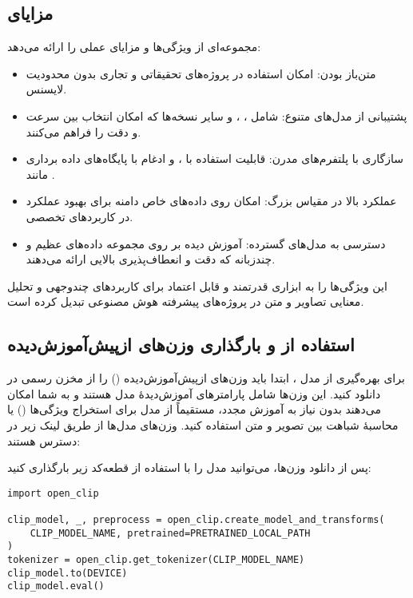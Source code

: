 \documentclass{article}
\begin{document}
\subsection{مزایای }
 مجموعه‌ای از ویژگی‌ها و مزایای عملی را ارائه می‌دهد:
\begin{itemize}
\item متن‌باز بودن: امکان استفاده در پروژه‌های تحقیقاتی و تجاری بدون محدودیت لایسنس.

\item پشتیبانی از مدل‌های متنوع: شامل ، ،  و سایر نسخه‌ها که امکان انتخاب بین سرعت و دقت را فراهم می‌کنند.

\item سازگاری با پلتفرم‌های مدرن: قابلیت استفاده با ،  و ادغام با پایگاه‌های داده برداری مانند .

\item عملکرد بالا در مقیاس بزرگ: امکان  روی داده‌های خاص دامنه برای بهبود عملکرد در کاربردهای تخصصی.

\item دسترسی به مدل‌های  گسترده: آموزش دیده بر روی مجموعه داده‌های عظیم و چندزبانه که دقت و انعطاف‌پذیری بالایی ارائه می‌دهند.

\end{itemize}

این ویژگی‌ها  را به ابزاری قدرتمند و قابل اعتماد برای کاربردهای چندوجهی و تحلیل معنایی تصاویر و متن در پروژه‌های پیشرفته هوش مصنوعی تبدیل کرده است.

\subsection{استفاده از  و بارگذاری وزن‌های ازپیش‌آموزش‌دیده}
برای بهره‌گیری از مدل ، ابتدا باید وزن‌های ازپیش‌آموزش‌دیده () را از مخزن رسمی  در  دانلود کنید.
این وزن‌ها شامل پارامترهای آموزش‌دیدهٔ مدل هستند و به شما امکان می‌دهند بدون نیاز به آموزش مجدد، مستقیماً از مدل برای استخراج ویژگی‌ها () یا محاسبهٔ شباهت بین تصویر و متن استفاده کنید.
وزن‌های مدل‌ها از طریق لینک زیر در دسترس هستند:


پس از دانلود وزن‌ها، می‌توانید مدل را با استفاده از قطعه‌کد زیر بارگذاری کنید:

\begin{latin}
\begin{lstlisting}
import open_clip

clip_model, _, preprocess = open_clip.create_model_and_transforms(
    CLIP_MODEL_NAME, pretrained=PRETRAINED_LOCAL_PATH
)
tokenizer = open_clip.get_tokenizer(CLIP_MODEL_NAME)
clip_model.to(DEVICE)
clip_model.eval()
\end{lstlisting}
\end{latin}
\end{document}
